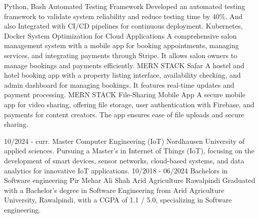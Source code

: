 \documentclass[9pt]{developercv}
\begin{document}
\begin{entrylist}
   \entry
   {Python, Bash}
   {Automated Testing Framework}
   {}
   {Developed an automated testing framework to validate system reliability and reduce testing time by 40\%. And also Integrated with CI/CD pipelines for continuous deployment.
   }
   \entry
   {Kubernetes, Docker}
   {System Optimization for Cloud Applications}
   {}
   {A comprehensive salon management system with a mobile app for booking appointments, managing services, and integrating payments through Stripe. It allows salon owners to manage bookings and payments efficiently.}
   \entry
   {MERN STACK}
   {Safar}
   {}
   {A hostel and hotel booking app with a property listing interface, availability checking, and admin dashboard for managing bookings. It features real-time updates and payment processing.}
   \entry
   {MERN STACK}
   {File-Sharing Mobile App}
   {}
   {A secure mobile app for video sharing, offering file storage, user authentication with Firebase, and payments for content creators. The app ensures ease of file uploads and secure sharing.}
\end{entrylist}

\vspace{-10 pt}
\begin{entrylist}
   \entry
   {10/2024 - curr.}
   {Master Computer Engineering (IoT) }
   {Nordhausen University of applied sciences.}
   {Pursuing a Master's in Internet of Things (IoT), focusing on the development of smart devices, sensor networks, cloud-based systems, and data analytics for innovative IoT applications.}
   \entry
   {10/2018 - 06/2024}
   {Bachelors in Software engineering}
   {Pir Mehar Ali Shah Arid Agriculture Rawalpindi}
   {Graduated with a Bachelor's degree in Software Engineering from Arid Agriculture University, Rawalpindi, with a CGPA of 1.1 / 5.0, specializing in Software engineering.}

\end{entrylist}
\end{document}
